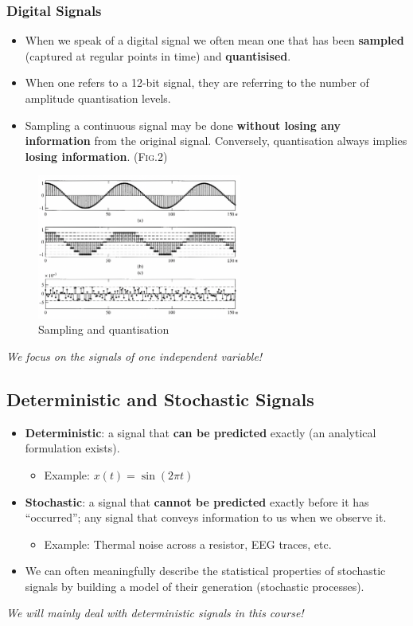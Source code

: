 \documentclass[12pt,a4paper]{article}
\begin{document}
 \subsubsection{Digital Signals}
 \begin{itemize}
 \item When we speak of a digital signal we often mean one that has been \textbf{sampled} (captured at regular points in time) and \textbf{quantisised}.
 \item When one refers to a 12-bit signal, they are referring to the number of amplitude quantisation levels.
 \item Sampling a continuous signal may be done \textbf{without losing any information} from the original signal. Conversely, quantisation always implies \textbf{losing information}. (\textsc{Fig.2})
 \end{itemize}
 \begin{figure}[h!]\centering
  \includegraphics[width = 0.6\textwidth]{images/1.2.1}
  \caption{Sampling and quantisation}
 \end{figure}
 \textit{We focus on the signals of one independent variable!}
 
\subsection{Deterministic and Stochastic Signals}
 \begin{itemize}
 \item \textbf{Deterministic}: a signal that \textbf{can be predicted} exactly (an analytical formulation exists). 
 \begin{itemize}
  \item Example: $x(t) = \sin(2\pi t)$
  \end{itemize}
 \item \textbf{Stochastic}: a signal that \textbf{cannot be predicted} exactly before it has “occurred”; any signal that conveys information to us when we observe it. 
  \begin{itemize}
  \item Example: Thermal noise across a resistor, EEG traces, etc.
  \end{itemize}
 \item We can often meaningfully describe the statistical properties of stochastic signals by building a model of their generation (stochastic processes).
 \end{itemize}
\textit{We will mainly deal with deterministic signals in this course!}
\end{document}
